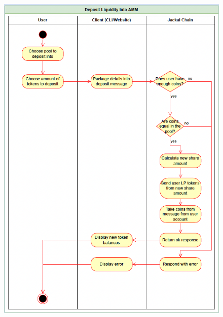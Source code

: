 \documentclass[a4paper]{article}
\begin{document}
\begin{figure}[!htbp]
\centering
\includegraphics[width=1\textwidth]{assets/lp2.png}
\caption{}
\end{figure}
\end{document}

